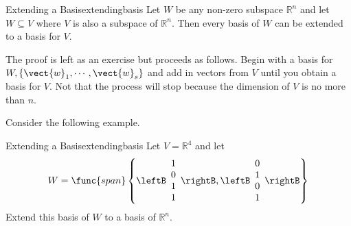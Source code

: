 \begin{theorem}{Extending a Basis}{extendingbasis}
Let $W$ be any non-zero subspace $\mathbb{R}^{n}$ and let $W\subseteq V$
where $V$ is also a subspace of $\mathbb{R}^{n}$. Then every basis of $W$
can be extended to a basis for $V$.
\end{theorem}

The proof is left as an exercise but proceeds as follows. Begin with a basis for $W,\left\{ \vect{w}_{1},\cdots ,\vect{w}_{s}\right\} $ and add in vectors from $V$ until you obtain a basis for $V$.
Not that the process will stop because the dimension of $V$ is no more than $n$. 

Consider the following example.

\begin{example}{Extending a Basis}{extendingbasis}
Let $V=\mathbb{R}^{4}$ and let 
\begin{equation*}
W=\func{span}\left\{ \leftB
\begin{array}{c}
1 \\ 
0 \\ 
1 \\ 
1
\end{array}
\rightB ,\leftB 
\begin{array}{c}
0 \\ 
1 \\ 
0 \\ 
1
\end{array}
\rightB \right\}
\end{equation*}
Extend this basis of $W$ to a basis of $\mathbb{R}^{n}$.
\end{example}

